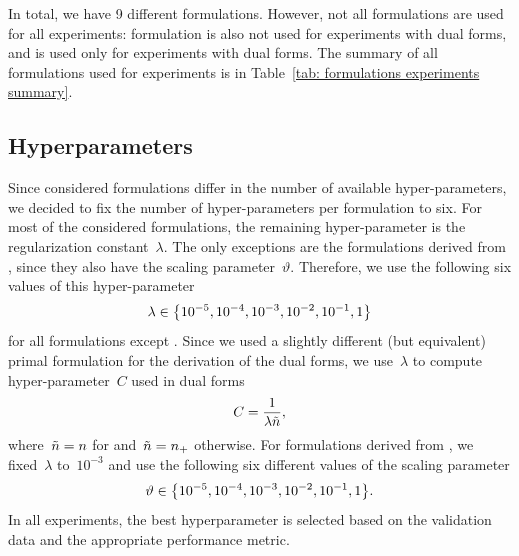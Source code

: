In total, we have 9 different formulations. However, not all formulations are used for all experiments: \BaseLine formulation is also not used for experiments with dual forms, and \SVM is used only for experiments with dual forms. The summary of all formulations used for experiments is in Table~\ref{tab: formulations experiments summary}.

\subsection{Hyperparameters}

Since considered formulations differ in the number of available hyper-parameters, we decided to fix the number of hyper-parameters per formulation to six. For most of the considered formulations, the remaining hyper-parameter is the regularization constant~$\lambda$. The only exceptions are the formulations derived from \PatMatNP, since they also have the scaling parameter~$\vartheta.$ Therefore, we use the following six values of this hyper-parameter
\begin{equation*}
  \lambda \in \Brac[c]{10^{-5}, 10^{-4}, 10^{-3}, 10^{-2}, 10^{-1}, 1}
\end{equation*}
for all formulations except \PatMatNP. Since we used a slightly different (but equivalent) primal formulation for the derivation of the dual forms, we use~$\lambda$ to compute hyper-parameter~$C$ used in dual forms
\begin{equation*}
  C = \frac{1}{\lambda \tilde{n}},
\end{equation*}
where~$\tilde{n} = n$ for \SVM and~$\tilde{n} = n_{+}$ otherwise. For formulations derived from \PatMatNP, we fixed~$\lambda$ to~$10^{-3}$ and use the following six different values of the scaling parameter
\begin{equation*}
  \vartheta \in \Brac[c]{10^{-5}, 10^{-4}, 10^{-3}, 10^{-2}, 10^{-1}, 1}.
\end{equation*}
In all experiments, the best hyperparameter is selected based on the validation data and the appropriate performance metric.

